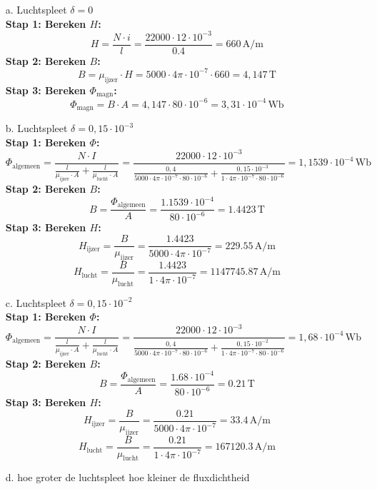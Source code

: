 \begin{enumerate}
    \item [a.]Luchtspleet \( \delta = 0 \)\\
        \textbf{Stap 1: Bereken \( H \):} 
        \[ H = 
            \frac{N \cdot i}{l} = \frac{22000 \cdot 12 \cdot 10^{-3}}{0.4} = 660 \, \text{A/m} \]
        \textbf{Stap 2: Bereken \( B \):} 
        \[ B = 
            \mu_{\text{ijzer}} \cdot H = 5000 \cdot 4\pi \cdot 10^{-7} \cdot 660 = 4,147 \, \text{T} \]
        \textbf{Stap 3: Bereken \( \Phi_{\text{magn}} \):} 
        \[ \Phi_{\text{magn}} = 
            B \cdot A = 4,147 \cdot 80 \cdot 10^{-6} = 3,31 \cdot 10^{-4} \, \text{Wb} \]

    \item [b.]Luchtspleet \( \delta = 0,15 \cdot 10^{-3}  \)\\
        \textbf{Stap 1: Bereken \( \Phi \):} 
        \[ \Phi_{\text{algemeen}} = 
            \frac{N \cdot I}{\frac{l}{\mu_{\text{ijzer}} \cdot A} + \frac{l}{\mu_{\text{lucht}} \cdot A}}  =    \frac{22000 \cdot 12 \cdot 10^{-3}}{\frac{0,4}{5000 \cdot 4\pi \cdot 10^{-7} \cdot 80 \cdot 10^{-6}} + \frac{0,15 \cdot 10^{-3}}{1 \cdot 4\pi \cdot 10^{-7} \cdot 80 \cdot 10^{-6}}} = 1,1539 \cdot 10^{-4} \, \text{Wb} \]
        \textbf{Stap 2: Bereken \( B \):} 
        \[ B = 
            \frac{\Phi_{\text{algemeen}}}{A} = \frac{1.1539 \cdot 10^{-4}}{80 \cdot 10^{-6}} = 1.4423 \, \text{T} \]
        \textbf{Stap 3: Bereken \( H \):}
        \[ H_{\text{ijzer}} = 
            \frac{B}{\mu_{\text{ijzer}}} = \frac{1.4423}{5000 \cdot 4\pi \cdot 10^{-7}} = 229.55 \, \text{A/m} \]
        \[ H_{\text{lucht}} = 
            \frac{B}{\mu_{\text{lucht}}} = \frac{1.4423}{1 \cdot 4\pi \cdot 10^{-7}} = 1147745.87 \, \text{A/m} \]

    \item [c.]Luchtspleet \( \delta = 0,15 \cdot 10^{-2}  \)\\
        \textbf{Stap 1: Bereken \( \Phi \):} 
        \[ \Phi_{\text{algemeen}} = 
            \frac{N \cdot I}{\frac{l}{\mu_{\text{ijzer}} \cdot A} + \frac{l}{\mu_{\text{lucht}} \cdot A}}  =    \frac{22000 \cdot 12 \cdot 10^{-3}}{\frac{0,4}{5000 \cdot 4\pi \cdot 10^{-7} \cdot 80 \cdot 10^{-6}} + \frac{0,15 \cdot 10^{-2}}{1 \cdot 4\pi \cdot 10^{-7} \cdot 80 \cdot 10^{-6}}} = 1,68 \cdot 10^{-4} \, \text{Wb} \]
        \textbf{Stap 2: Bereken \( B \):} 
        \[ B = 
            \frac{\Phi_{\text{algemeen}}}{A} = \frac{1.68 \cdot 10^{-4}}{80 \cdot 10^{-6}} = 0.21 \, \text{T} \]
        \textbf{Stap 3: Bereken \( H \):}
        \[ H_{\text{ijzer}} = 
            \frac{B}{\mu_{\text{ijzer}}} = \frac{0.21}{5000 \cdot 4\pi \cdot 10^{-7}} = 33.4 \, \text{A/m} \]
        \[ H_{\text{lucht}} = 
            \frac{B}{\mu_{\text{lucht}}} = \frac{0.21}{1 \cdot 4\pi \cdot 10^{-7}} = 167120.3 \, \text{A/m} \]
    \item [d.] hoe groter de luchtspleet hoe kleiner de fluxdichtheid
\end{enumerate}

